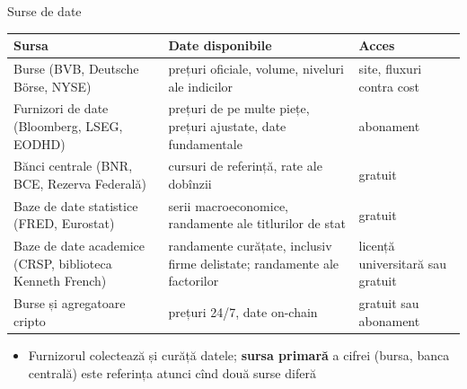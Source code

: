 \begin{frame}{Surse de date}
\itemsize{\small}
\begin{center}
\footnotesize
\begin{tabular}{>{\raggedright\arraybackslash}p{3.4cm}>{\raggedright\arraybackslash}p{5.6cm}>{\raggedright\arraybackslash}p{3.4cm}}
\toprule
\textbf{Sursa} & \textbf{Date disponibile} & \textbf{Acces} \\
\midrule
Burse (BVB, Deutsche Börse, NYSE) & prețuri oficiale, volume, niveluri ale indicilor & site, fluxuri contra cost \\
Furnizori de date (Bloomberg, LSEG, EODHD) & prețuri de pe multe piețe, prețuri ajustate, date fundamentale & abonament \\
Bănci centrale (BNR, BCE, Rezerva Federală) & cursuri de referință, rate ale dobînzii & gratuit \\
Baze de date statistice (FRED, Eurostat) & serii macroeconomice, randamente ale titlurilor de stat & gratuit \\
Baze de date academice (CRSP, biblioteca Kenneth French) & randamente curățate, inclusiv firme delistate; randamente ale factorilor & licență universitară sau gratuit \\
Burse și agregatoare cripto & prețuri 24/7, date on-chain & gratuit sau abonament \\
\bottomrule
\end{tabular}
\end{center}
\begin{itemize}
    \item Furnizorul colectează și curăță datele; \textbf{sursa primară} a cifrei (bursa, banca centrală) este referința atunci cînd două surse diferă
\end{itemize}
\end{frame}

